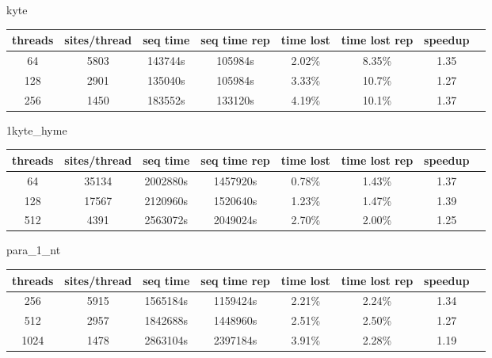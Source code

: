 \documentclass[a4paper]{article}
\begin{document}
kyte

\begin{tabular}{|c|c|c|c|c|c|c|c|}
\hline threads & sites/thread & seq time & seq time rep & time lost & time lost rep & speedup \\
\hline 64 & 5803 & 143744s & 105984s & 2.02\% & 8.35\% & 1.35 \\
\hline 128 & 2901 & 135040s & 105984s & 3.33\% & 10.7\% & 1.27 \\
\hline 256 & 1450 & 183552s & 133120s & 4.19\% & 10.1\% & 1.37 \\
\hline
\end{tabular}
\newline

1kyte\_hyme

\begin{tabular}{|c|c|c|c|c|c|c|c|}
\hline threads & sites/thread & seq time & seq time rep & time lost & time lost rep & speedup \\
\hline 64 & 35134 & 2002880s & 1457920s & 0.78\% & 1.43\% & 1.37 \\
\hline 128 & 17567 & 2120960s & 1520640s & 1.23\% & 1.47\% & 1.39 \\
\hline 512 & 4391 & 2563072s & 2049024s & 2.70\% & 2.00\% & 1.25 \\
\hline
\end{tabular}
\newline

para\_1\_nt

\begin{tabular}{|c|c|c|c|c|c|c|c|}
\hline threads & sites/thread & seq time & seq time rep & time lost & time lost rep & speedup \\
\hline 256 & 5915 & 1565184s & 1159424s & 2.21\% & 2.24\% & 1.34 \\
\hline 512 & 2957 & 1842688s & 1448960s & 2.51\% & 2.50\% & 1.27 \\
\hline 1024 & 1478 & 2863104s & 2397184s & 3.91\% & 2.28\% & 1.19 \\
\hline
\end{tabular}
\newline
\end{document}
